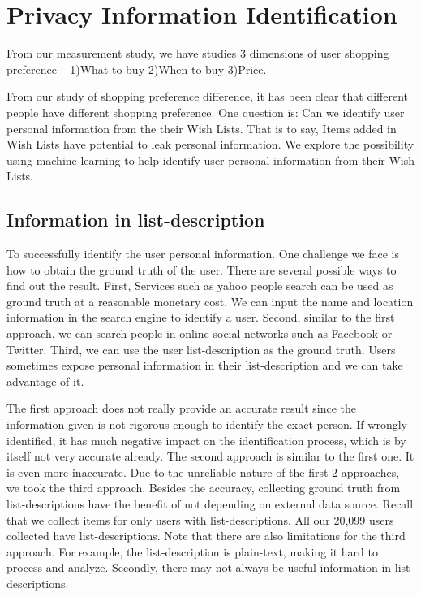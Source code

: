 \section{Privacy Information Identification}

From our measurement study, we have studies 3 dimensions of user shopping preference -- 1)What to buy 2)When to buy 3)Price.

From our study of shopping preference difference, it has been clear that different people have different shopping preference. One question is: Can we identify user personal information from the their Wish Lists. That is to say, Items added in Wish Lists have potential to leak personal information. We explore the possibility using machine learning to help identify user personal information from their Wish Lists.
\subsection{Information in list-description}
To successfully identify the user personal information. One challenge we face is how to obtain the ground truth of the user. There are several possible ways to find out the result. First, Services such as yahoo people search can be used as ground truth at a reasonable monetary cost. We can input the name and location information in the search engine to identify a user. Second, similar to the first approach, we can search people in online social networks such as Facebook or Twitter. Third, we can use the user list-description as the ground truth. Users sometimes expose personal information in their list-description and we can take advantage of it.

The first approach does not really provide an accurate result since the information given is not rigorous enough to identify the exact person. If wrongly identified, it has much negative impact on the identification process, which is by itself not very accurate already. The second approach is similar to the first one. It is even more inaccurate. Due to the unreliable nature of the first 2 approaches, we took the third approach. Besides the accuracy, collecting ground truth from list-descriptions have the benefit of not depending on external data source. Recall that we collect items for only users with list-descriptions. All our 20,099 users collected have list-descriptions. Note that there are also limitations for the third approach. For example, the list-description is plain-text, making it hard to process and analyze. Secondly, there may not always be useful information in list-descriptions.

